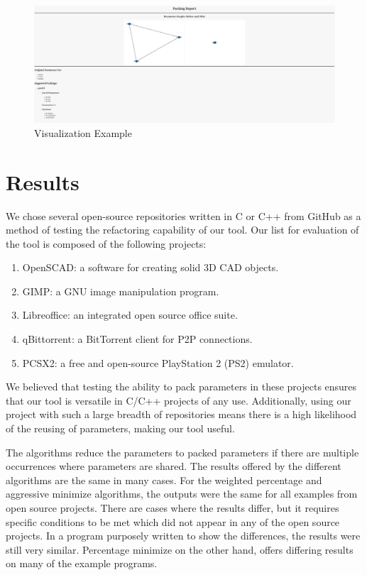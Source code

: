 \documentclass{article}
\begin{document}
\begin{figure}[ht]
    \includegraphics[width=\linewidth]{im6.png}%
    \caption{Visualization Example}
    \label{fig:visual_example}
\end{figure}

\newpage

\section{Results}

We chose several open-source repositories written in C or C++ from GitHub as a method of testing the refactoring capability of our tool. Our list for evaluation of the tool is composed of the following projects:

\begin{enumerate}
    \item OpenSCAD: a software for creating solid 3D CAD objects.
    \item GIMP: a GNU image manipulation program.
    \item Libreoffice: an integrated open source office suite.
    \item qBittorrent: a BitTorrent client for P2P connections.
    \item PCSX2: a free and open-source PlayStation 2 (PS2) emulator.
\end{enumerate}

We believed that testing the ability to pack parameters in these projects ensures that our tool is versatile in C/C++ projects of any use. Additionally, using our project with such a large breadth of repositories means there is a high likelihood of the reusing of parameters, making our tool useful. 

The algorithms reduce the parameters to packed parameters if there are multiple occurrences where parameters are shared. The results offered by the different algorithms are the same in many cases. For the weighted percentage and aggressive minimize algorithms, the outputs were the same for all examples from open source projects. There are cases where the results differ, but it requires specific conditions to be met which did not appear in any of the open source projects. In a program purposely written to show the differences, the results were still very similar. Percentage minimize on the other hand, offers differing results on many of the example programs.
\end{document}
